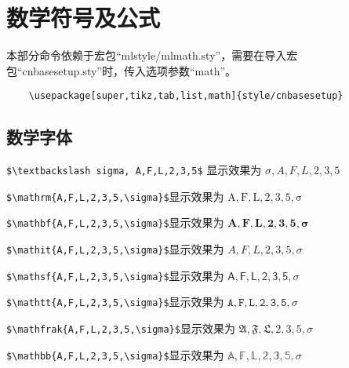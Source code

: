 \chapter{数学符号及公式}\label{cha:matheq}
本部分命令依赖于宏包“mlstyle/mlmath.sty”，需要在导入宏包“cnbasesetup.sty”时，传入选项参数“math”。
\begin{verbatim}
    \usepackage[super,tikz,tab,list,math]{style/cnbasesetup}
\end{verbatim}

\section{数学字体}

\begin{example}[数学文本测试]
    \verb|$\textbackslash sigma, A,F,L,2,3,5$| 显示效果为 $\sigma, A,F,L,2,3,5$
\end{example}
\begin{example}[mathrm测试]
    \texttt{\$\textbackslash mathrm\{A,F,L,2,3,5,\textbackslash sigma\}\$}显示效果为 $\mathrm{A,F,L,2,3,5,\sigma}$
\end{example}
\begin{example}[mathbf测试]
    \texttt{\$\textbackslash mathbf\{A,F,L,2,3,5,\textbackslash sigma\}\$}显示效果为 $\mathbf{A,F,L,2,3,5,\sigma}$
\end{example}
\begin{example}[mathit测试]
    \texttt{\$\textbackslash mathit\{A,F,L,2,3,5,\textbackslash sigma\}\$}显示效果为 $\mathit{A,F,L,2,3,5,\sigma}$
\end{example}
\begin{example}[mathsf测试]
    \texttt{\$\textbackslash mathsf\{A,F,L,2,3,5,\textbackslash sigma\}\$}显示效果为 $\mathsf{A,F,L,2,3,5,\sigma}$
\end{example}
\begin{example}[mathtt测试]
    \texttt{\$\textbackslash mathtt\{A,F,L,2,3,5,\textbackslash sigma\}\$}显示效果为 $\mathtt{A,F,L,2,3,5,\sigma}$
\end{example}
\begin{example}[mathfrak测试]
    \texttt{\$\textbackslash mathfrak\{A,F,L,2,3,5,\textbackslash sigma\}\$}显示效果为 $\mathfrak{A,F,L,2,3,5,\sigma}$
\end{example}
\begin{example}[mathbb测试]
    \texttt{\$\textbackslash mathbb\{A,F,L,2,3,5,\textbackslash sigma\}\$}显示效果为 $\mathbb{A,F,L,2,3,5,\sigma}$
\end{example}
